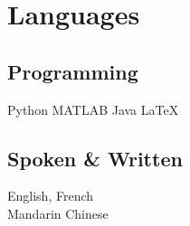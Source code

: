 \documentclass[]{deedy-resume-openfont}
\begin{document}
\section{Languages}
\begin{minipage}[t]{.6\textwidth}
\subsection{Programming}
Python \textbullet{} MATLAB \textbullet{} Java \textbullet{} \LaTeX
\end{minipage}
\hfill
\begin{minipage}[t]{.35\textwidth}
\subsection{Spoken \& Written}
 English, French \\
 Mandarin Chinese\\
\end{minipage}
\end{document}
